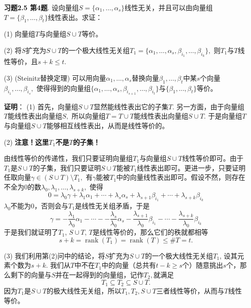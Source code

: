 \newpageorvspace

{\bf 习题2.5 第4题}. 设向量组$S = \{ \alpha_1, \ldots, \alpha_s \}$线性无关，并且可以由向量组$T = \{ \beta_1, \ldots, \beta_t \}$线性表出。求证：

(1) 向量组$T$与向量组$S \cup T$等价。

(2) 将$S$扩充为$S \cup T$的一个极大线性无关组$T_1 = \{ \alpha_1, \ldots, \alpha_s, \beta_{i_1}, \ldots, \beta_{i_k} \},$ 则$T_1$与$T$线性等价，且$s+k \leqslant t.$

(3) (Steinitz替换定理) 可以用向量$\alpha_1, \ldots, \alpha_s$替换向量$\beta_1, \ldots, \beta_t$中某$s$个向量$\beta_{i_1}, \ldots, \beta_{i_s},$ 使得得到的向量组$\{ \alpha_1, \ldots, \alpha_s, \beta_{i_{s+1}}, \ldots, \beta_{i_t} \}$与$\{ \beta_1, \ldots, \beta_t \}$等价。

\newpageorvspace

{\bf 证明}： (1) 首先，向量组$S\cup T$显然能线性表出它的子集$T$. 另一方面，由于向量组$T$能线性表出向量组$S,$ 所以向量组$T = T\cup T$能线性表出向量组$S\cup T.$ 于是向量组$T$与向量组$S \cup T$能够相互线性表出，从而是线性等价的。

(2) \textbf{\color{red}注意！这里$T_1$不是$T$的子集！}

由线性等价的传递性，我们只要证明向量组$T_1$与向量组$S \cup T$线性等价即可。由于$T_1$是$S \cup T$的子集，我们只要证明$S \cup T$能被$T_1$线性表出即可。更进一步，只要证明任取向量$\gamma \in (S \cup T) \setminus T_1,$ 有$\gamma$能被$T_1$中的向量线性表出即可。假设不然，则存在不全为0的数$\lambda_0, \lambda_1, \ldots, \lambda_{s+k},$ 使得
$$0 = \lambda_0 \gamma + \lambda_1 \alpha_1 + \cdots + \lambda_s \alpha_s + \lambda_{s+1} \beta_{i_1} + \cdots + \lambda_{s+k} \beta_{i_k}$$
$\lambda_0$不能为0，否则会与$T_1$是线性无关组矛盾，于是
$$\gamma = -\dfrac{\lambda_1}{\lambda_0} \alpha_1 - \cdots - -\dfrac{\lambda_s}{\lambda_0} \alpha_s - \dfrac{\lambda_{s+1}}{\lambda_0} \beta_{i_1} - \cdots - \dfrac{\lambda_{s+k}}{\lambda_0} \beta_{i_k}$$
于是我们就证明了$T_1$, $S \cup T$, $T$是线性等价的，那么它们的秩就都相等
$$s+k = \operatorname{rank}(T_1) = \operatorname{rank}(T) \leqslant \# T = t.$$

(3) 我们利用第(2)问中的结论，将$S$扩充为$S \cup T$的一个极大线性无关组$T_1$, 设其元素个数为$s+k.$ 我们从$T$中不在$T_1$中的向量（总共有$t - k \geqslant s$个）随意挑出$s$个，那么剩下的向量与$S$并在一起得到的向量组，记作$T_2,$就满足
$$T_1 \subseteq T_2 \subseteq S \cup T.$$
因为$T_1$是$S \cup T$的极大线性无关组，所以$T_1, T_2, S \cup T$三者线性等价，从而与$T$线性等价。


